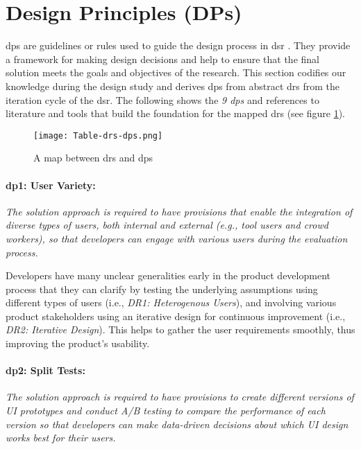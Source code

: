\clearpage
\section{Design Principles (DPs)}
\label{design:section:designprinciple}
\ac{dp}s are guidelines or rules used to guide the design process in \ac{dsr} \cite{misc:dsr:henver}. 
They provide a framework for making design decisions \cite{paper:designprinciple:gregor} and help to ensure that the final solution meets the goals and objectives of the research. 
This section codifies our knowledge during the design study and derives \ac{dp}s from abstract \ac{dr}s from the iteration cycle of the \ac{dsr}.
The following shows the \textit{9 \ac{dp}s} and references to literature and tools that build the foundation for the mapped \ac{dr}s (see figure \ref{fig:design:table-drs-dps}). 
\begin{figure}[htbp!]
  \centering    
  \texttt{[image: Table-drs-dps.png]}
  \caption[A map between \ac{dr}s and \ac{dp}s]{A map between \ac{dr}s and \ac{dp}s}
  \label{fig:design:table-drs-dps}
\end{figure}

\paragraph{\ac{dp}1: User Variety:} \textit{The solution approach is required to have provisions that enable the integration of diverse types of users, both internal and external (e.g., tool users and crowd workers), so that developers can engage with various users during the evaluation process.}

Developers have many unclear generalities early in the product development process \cite{misc:lean:steve} that they can clarify by testing the underlying assumptions using different types of users (i.e., \textit{DR1: Heterogenous Users}), and involving various product stakeholders using an iterative design for continuous improvement (i.e., \textit{DR2: Iterative Design}).
This helps to gather the user requirements smoothly, thus improving the product's usability.

\paragraph{\ac{dp}2: Split Tests:} \textit{The solution approach is required to have provisions to create different versions of UI prototypes and conduct A/B testing to compare the performance of each version so that developers can make data-driven decisions about which UI design works best for their users.}

